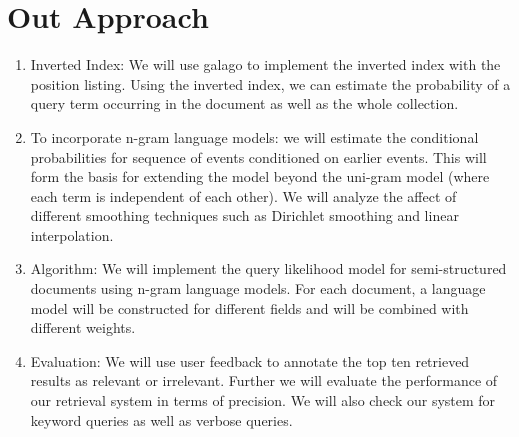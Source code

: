 \documentclass[draftcls, onecolumn, 11pt]{IEEEtran}
\begin{document}
\section{\textbf{Out Approach}}
\begin{enumerate}
\item Inverted Index: We will use galago to implement the inverted index with the position listing. Using the inverted index, we can estimate the probability of a query term occurring in the document as well as the whole collection.

\item To incorporate n-gram language models:  we will estimate the conditional probabilities for sequence of events conditioned on earlier events. This will form the basis for extending the model beyond the uni-gram model (where each term is independent of each other). We will analyze the affect of different smoothing techniques such as Dirichlet smoothing and linear interpolation.

\item Algorithm: We will implement the query likelihood model for semi-structured documents using n-gram language models. For each document, a language model will be constructed for different fields and will be combined with different weights.

\item Evaluation: We will use user feedback to annotate the top ten retrieved results as relevant or irrelevant. Further we will evaluate the performance of our retrieval system in terms of precision. We will also check our system for keyword queries as well as verbose queries.

\end{enumerate}


\end{document}

